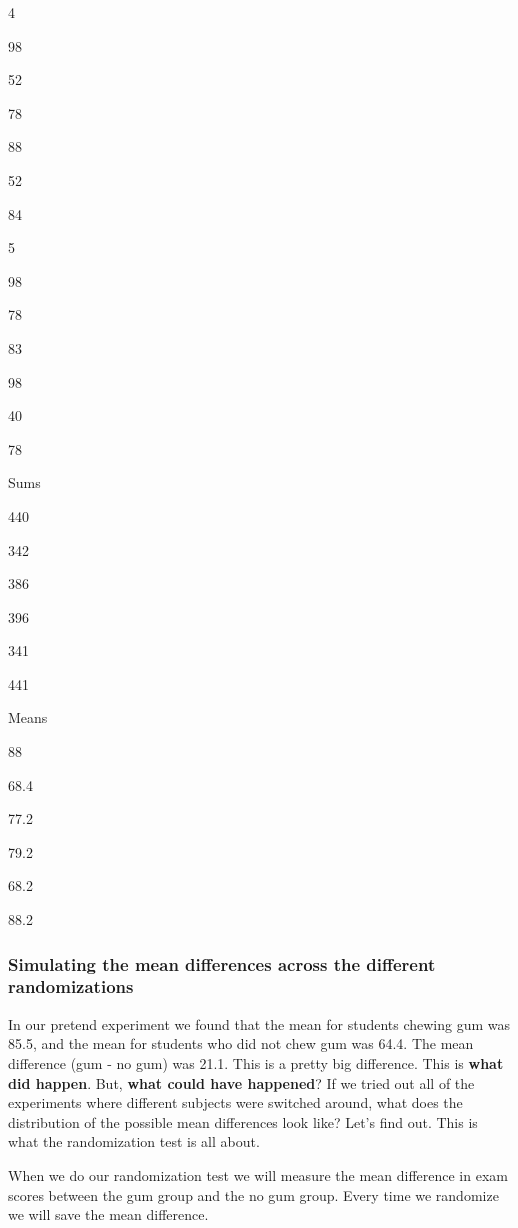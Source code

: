 \documentclass[
]{book}
\begin{document}
4

98

52

78

88

52

84

5

98

78

83

98

40

78

Sums

440

342

386

396

341

441

Means

88

68.4

77.2

79.2

68.2

88.2

\hypertarget{simulating-the-mean-differences-across-the-different-randomizations}{%
\subsubsection{Simulating the mean differences across the different randomizations}\label{simulating-the-mean-differences-across-the-different-randomizations}}

In our pretend experiment we found that the mean for students chewing gum was 85.5, and the mean for students who did not chew gum was 64.4. The mean difference (gum - no gum) was 21.1. This is a pretty big difference. This is \textbf{what did happen}. But, \textbf{what could have happened}? If we tried out all of the experiments where different subjects were switched around, what does the distribution of the possible mean differences look like? Let's find out. This is what the randomization test is all about.

When we do our randomization test we will measure the mean difference in exam scores between the gum group and the no gum group. Every time we randomize we will save the mean difference.
\end{document}
